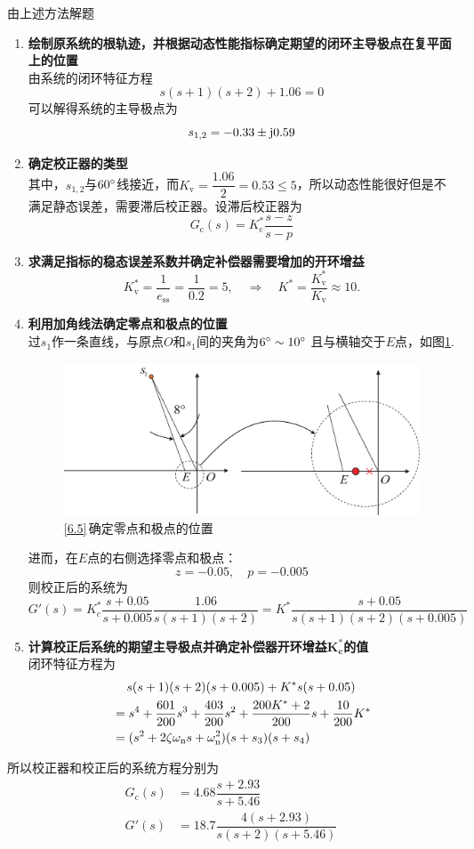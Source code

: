 \solve 由上述方法解题
\begin{enumerate}
	\item \textbf{绘制原系统的根轨迹，并根据动态性能指标确定期望的闭环主导极点在复平面上的位置}\\
	由系统的闭环特征方程
	\[
	s(s+1)(s+2)+1.06 = 0
	\]
	可以解得系统的主导极点为
	\[
	s_{1,2} = -0.33 \pm \text{j} 0.59
	\]
	\item \textbf{确定校正器的类型}\\
	其中，$s_{1,2}$与$60 {}^{\circ}$线接近，而$K_\text{v} = \dfrac{1.06}{2} = 0.53 \le 5$，所以动态性能很好但是不满足静态误差，需要滞后校正器。设滞后校正器为
	\[
	G_{\text{c}}(s) = K_\text{c}^* \dfrac{s - z}{s - p}
	\]
	\item \textbf{求满足指标的稳态误差系数并确定补偿器需要增加的开环增益}\\
	\[
	K_\text{v}^* = \dfrac{1}{e_{\text{ss}}} = \dfrac{1}{0.2} = 5, \quad \Rightarrow \quad K^* = \dfrac{K_\text{v}^*}{K_\text{v}} \approx 10.
	\]
	\item \textbf{利用加角线法确定零点和极点的位置}\\
	过$s_1$作一条直线，与原点$O$和$s_1$间的夹角为$6{}^{\circ} \sim 10{}^{\circ}$ 且与横轴交于$E$点，如图\ref{6.5.2}.
	\begin{figure}[!htb]
		\centering
		\includegraphics[width=0.7\linewidth]{pic/根轨迹滞后.pdf}
		\vspace*{-1em}
		\caption{\ref{6.5}$\,$确定零点和极点的位置}
		\label{6.5.2}
	\end{figure}

	进而，在$E$点的右侧选择零点和极点：
	\[
	z = -0.05, \quad p = -0.005
	\]
	则校正后的系统为
	\[
	G'(s) = K_c^* \dfrac{s + 0.05}{s + 0.005} \dfrac{1.06}{s(s+1)(s+2)} = K^* \dfrac{s + 0.05}{s(s+1)(s+2)(s+0.005)}
	\]
	\item \textbf{计算校正后系统的期望主导极点并确定补偿器开环增益$\bm{K_\text{c}^*}$的值}\\
	闭环特征方程为
	\begin{align*}
		& \quad \, s(s+1)(s+2)(s+0.005) + K^*s(s+0.05) \\&= s^4 + \dfrac{601}{200}s^3 + \dfrac{403}{200}s^2 + \dfrac{200K^*+2}{200}s + \dfrac{10}{200}K^*\\
		& = (s^2 +2\zeta \omega_{\rm{n}} s + \omega_{{\rm{n}}}^2)(s + s_3)(s + s_4)
	\end{align*}
	
	
	
	
\end{enumerate}
所以校正器和校正后的系统方程分别为
\begin{align*}
	G_\text{c} (s) &=4.68 \dfrac{s + 2.93}{s + 5.46}\\[0.5em]
	G'(s) &= 18.7 \dfrac{4(s + 2.93)}{s(s+2)(s+5.46)}
\end{align*}




